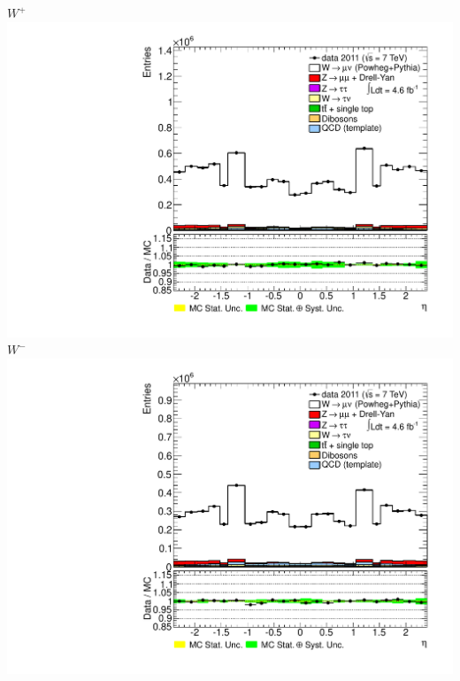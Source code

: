{
\colb[T]
\centering
\small{ $W^{+}$}
\includegraphics[width=1.0\textwidth]{dates/20130403/figures/new/STACKS/CONTROL25/P_stack_d3_eta_lpt_met_y_2__1_z_0__1_POS}
\centering
\small{ $W^{-}$}
\includegraphics[width=1.0\textwidth]{dates/20130403/figures/new/STACKS/CONTROL25/P_stack_d3_eta_lpt_met_y_2__1_z_0__1_NEG}
\cole
}

